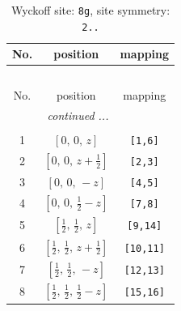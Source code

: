 \documentclass[fleqn,8pt]{jsarticle}
\begin{document}
\renewcommand{\arraystretch}{1.2}
\begin{longtable}{ccc}
\caption{Wyckoff site: {\tt 8g}, site symmetry: {\tt 2..}}
 \\
 \hline \hline
No. & position & mapping \\ \hline \endfirsthead

\multicolumn{2}{l}{\tablename\ \thetable{}} \\
 \hline \hline
No. & position & mapping \\ \hline \endhead

 \hline \hline
\multicolumn{2}{r}{\footnotesize\it continued ...} \\ \endfoot

 \hline \hline
\multicolumn{2}{r}{} \\ \endlastfoot

1 & $\left[ 0,\, 0,\, z \right]$ & {\tt [1,6]} \\ \hline
2 & $\left[ 0,\, 0,\, z + \frac{1}{2} \right]$ & {\tt [2,3]} \\ \hline
3 & $\left[ 0,\, 0,\, - z \right]$ & {\tt [4,5]} \\ \hline
4 & $\left[ 0,\, 0,\, \frac{1}{2} - z \right]$ & {\tt [7,8]} \\ \hline
5 & $\left[ \frac{1}{2},\, \frac{1}{2},\, z \right]$ & {\tt [9,14]} \\ \hline
6 & $\left[ \frac{1}{2},\, \frac{1}{2},\, z + \frac{1}{2} \right]$ & {\tt [10,11]} \\ \hline
7 & $\left[ \frac{1}{2},\, \frac{1}{2},\, - z \right]$ & {\tt [12,13]} \\ \hline
8 & $\left[ \frac{1}{2},\, \frac{1}{2},\, \frac{1}{2} - z \right]$ & {\tt [15,16]} \\
\end{longtable}
\renewcommand{\arraystretch}{1.2}
\end{document}
